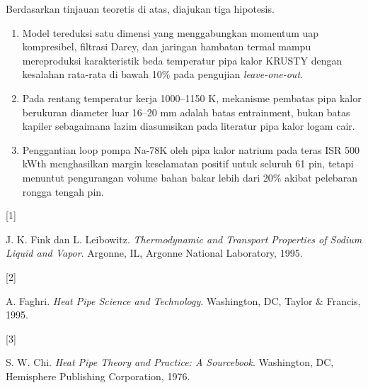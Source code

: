 \documentclass[
  indonesian,
  12pt,
  a4paper,
]{report}
\newlength{\cslhangindent}
\newlength{\csllabelwidth}
\newenvironment{CSLReferences}[2] %
 {\begin{list}{}{%
  \setlength{\itemindent}{0pt}
  \setlength{\leftmargin}{0pt}
  \setlength{\parsep}{0pt}
  \ifodd #1
   \setlength{\leftmargin}{\cslhangindent}
   \setlength{\itemindent}{-1\cslhangindent}
  \fi
  \setlength{\itemsep}{#2\baselineskip}}}
 {\end{list}}
\newcommand{\CSLLeftMargin}[1]{\parbox[t]{\csllabelwidth}{\strut#1\strut}}
\newcommand{\CSLRightInline}[1]{\parbox[t]{\linewidth - \csllabelwidth}{\strut#1\strut}}
\providecommand{\tightlist}{%
  \setlength{\itemsep}{0pt}\setlength{\parskip}{0pt}}
\begin{document}
Berdasarkan tinjauan teoretis di atas, diajukan tiga hipotesis.

\begin{enumerate}
\def\labelenumi{\arabic{enumi}.}
\tightlist
\item
  Model tereduksi satu dimensi yang menggabungkan momentum uap
  kompresibel, filtrasi Darcy, dan jaringan hambatan termal mampu
  mereproduksi karakteristik beda temperatur pipa kalor KRUSTY dengan
  kesalahan rata-rata di bawah 10\% pada pengujian \emph{leave-one-out}.
\item
  Pada rentang temperatur kerja 1000--1150 K, mekanisme pembatas pipa
  kalor berukuran diameter luar 16--20 mm adalah batas entrainment,
  bukan batas kapiler sebagaimana lazim diasumsikan pada literatur pipa
  kalor logam cair.
\item
  Penggantian loop pompa Na-78K oleh pipa kalor natrium pada teras ISR
  500 kWth menghasilkan margin keselamatan positif untuk seluruh 61 pin,
  tetapi menuntut pengurangan volume bahan bakar lebih dari 20\% akibat
  pelebaran rongga tengah pin.
\end{enumerate}

\protect{}\label{refs}
\begin{CSLReferences}{0}{1}
\CSLLeftMargin{{[}1{]} }%
\CSLRightInline{J. K. Fink dan L. Leibowitz. \emph{Thermodynamic and
Transport Properties of Sodium Liquid and Vapor}. Argonne, IL, Argonne
National Laboratory, 1995.}

\CSLLeftMargin{{[}2{]} }%
\CSLRightInline{A. Faghri. \emph{Heat Pipe Science and Technology}.
Washington, DC, Taylor \& Francis, 1995.}

\CSLLeftMargin{{[}3{]} }%
\CSLRightInline{S. W. Chi. \emph{Heat Pipe Theory and Practice: A
Sourcebook}. Washington, DC, Hemisphere Publishing Corporation, 1976.}

\end{CSLReferences}
\end{document}
